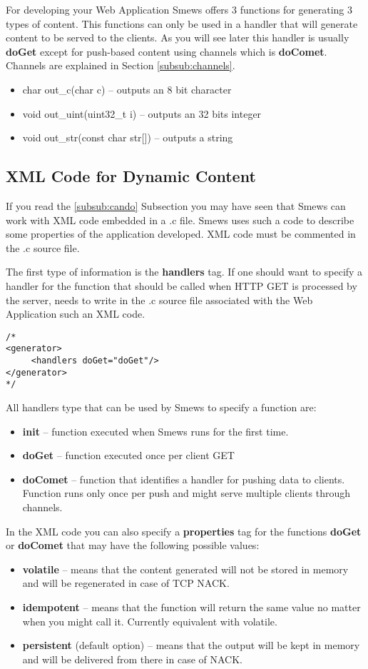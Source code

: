 \documentclass{report}
\begin{document}
For developing your Web Application Smews offers 3 functions for generating 3 types of content. This functions can only be used in a handler that will generate content to be served to the clients. As you will see later this handler is usually \textbf{doGet} except for push-based content using channels which is \textbf{doComet}. Channels are explained in Section \ref{subsub:channels}.
\begin{itemize}
\item char out\_c(char c) -- outputs an 8 bit character
\item void out\_uint(uint32\_t i) -- outputs an 32 bits integer
\item void out\_str(const char str[]) -- outputs a string
\end{itemize}

\subsection{XML Code for Dynamic Content}

If you read the \ref{subsub:cando} Subsection you may have seen that Smews can work with XML code embedded in a  .c file. Smews uses such a code to describe some properties of the application developed. XML code must be commented in the .c source file.

The first type of information is the \textbf{handlers} tag. If one should want to specify a handler for the function that should be called when HTTP GET is processed by the server, needs to write in the .c source file associated with the Web Application such an XML code.
\begin{verbatim}
/*
<generator>
     <handlers doGet="doGet"/>
</generator>
*/
\end{verbatim}

All handlers type that can be used by Smews to specify a function are:
\begin{itemize}
\item \textbf{init} -- function executed when Smews runs for the first time.
\item \textbf{doGet} -- function executed once per client GET
\item \textbf{doComet} -- function that identifies a handler for pushing data to clients. Function runs only once per push and might serve multiple clients through channels.
\end{itemize}

In the XML code you can also specify a \textbf{properties} tag for the functions \textbf{doGet} or \textbf{doComet} that may have the following possible values:
\begin{itemize}
\item \textbf{volatile} -- means that the content generated will not be stored in memory and will be regenerated in case of TCP NACK.
\item \textbf{idempotent} -- means that the function will return the same value no matter when you might call it. Currently equivalent with volatile.
\item \textbf{persistent} (default option) -- means that the output will be kept in memory and will be delivered from there in case of NACK.
\end{itemize}
\end{document}
